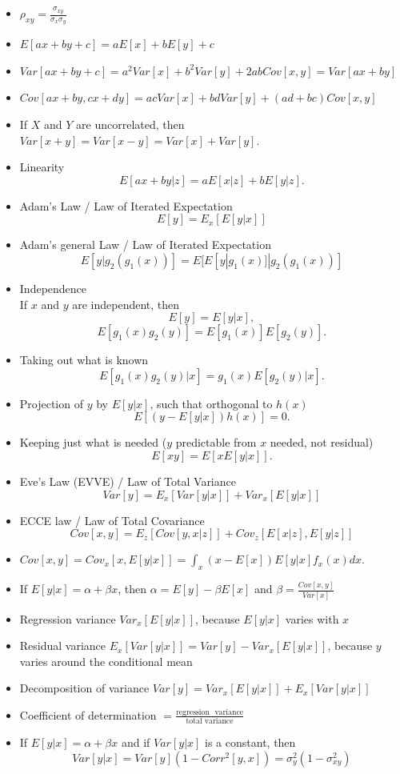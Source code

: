 \documentclass[a4paper,12pt]{article}
\begin{document}
\begin{itemize}
	\item $\rho_{xy}=\frac{\sigma_{xy}}{\sigma_{x}\sigma_{y}}$
	\item $E[ax + by + c] = aE[x] + bE[y] + c$
	\item $Var[ax + by + c] = a^{2}Var[x] + b^{2}Var[y] + 2abCov[x, y]=Var[ax + by]$
	\item $Cov[ax + by, cx + dy] = ac Var[x] + bd Var[y] + (ad + bc)Cov[x, y]$
	\item If $X$ and $Y$ are uncorrelated, then $Var[x + y] = Var[x - y] = Var[x] + Var[y].$
	\item Linearity
	$$E[ax + by |z] = aE[x|z] + bE[y|z].$$
	\item Adam's Law / Law of Iterated Expectation
	$$E[y] = E_{x}[E[y | x]]$$
	\item Adam's general Law / Law of Iterated Expectation
	$$E[y|g_{2}(g_{1}(x))] = E[E[y | g_{1}(x)]|g_{2}(g_{1}(x))]$$
	\item Independence\\
	If $x$ and $y$ are independent, then $$E[y] = E[y|x],$$
	$$E[g_{1}(x)g_{2}(y)] = E[g_{1}(x)]E[g_{2}(y)].$$
	\item Taking out what is known
	$$E[g_{1}(x)g_{2}(y)|x] = g_{1}(x)E[g_{2}(y)|x].$$
	\item Projection of $y$ by $E[y|x]$, such that orthogonal to $h(x)$
	$$E[(y-E[y|x])h(x)] = 0.$$
	\item Keeping just what is needed ($y$ predictable from $x$ needed, not residual)
	$$E[xy] = E[xE[y|x]].$$
	\item Eve's Law (EVVE) / Law of Total Variance
	$$Var[y] = E_{x}[Var[y | x]] + Var_{x}[E[y | x]]$$
	\item ECCE law / Law of Total Covariance
	$$Cov[x,y] = E_{z}[Cov[y,x | z]] + Cov_{z}[E[x | z],E[y | z]]$$
	\item $Cov[x, y] = Cov_{x}[x, E[y | x]] =\int_{x}\left(x - E[x]\right)E[y | x] f_{x}(x) dx.$
	\item If $E[y | x] = \alpha + \beta x$, then $\alpha = E[y] - \beta E[x]$ and $\beta= \frac{Cov[x, y]}{Var[x]}$
	\item Regression variance $Var_{x}[E[y | x]]$, because $E[y | x]$ varies with $x$
	\item Residual variance $E_{x}[Var[y | x]] = Var[y] - Var_{x}[E[y | x]]$, because $y$ varies around the conditional mean
	\item Decomposition of variance $Var[y] = Var_{x}[E[y | x]] + E_{x}[Var[y | x]]$
	\item Coefficient of determination $= \frac{\text{regression~ variance}}{\text{total variance}}$
	\item If $E[y | x] = \alpha + \beta x$ and if $Var[y | x]$ is a constant, then $$Var[y | x] = Var[y]\left(1 - Corr^{2}[y, x]\right)= \sigma^{2}_{y}\left(1 - \sigma^{2}_{xy}\right)$$
\end{itemize}
\end{document}
